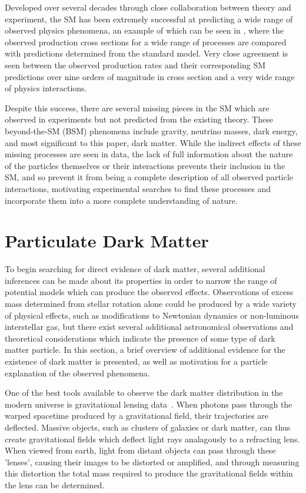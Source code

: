 Developed over several decades through close collaboration between theory and experiment, the SM has been extremely successful at predicting a wide range of observed physics phenomena, an example of which can be seen in , where the observed production cross sections for a wide range of processes are compared with predictions determined from the standard model.
Very close agreement is seen between the observed production rates and their corresponding SM predictions over nine orders of magnitude in cross section and a very wide range of physics interactions.

Despite this success, there are several missing pieces in the SM which are observed in experiments but not predicted from the existing theory.
These beyond-the-SM (BSM) phenomena include gravity, neutrino masses, dark energy, and most significant to this paper, dark matter.
While the indirect effects of these missing processes are seen in data, the lack of full information about the nature of the particles themselves or their interactions prevents their inclusion in the SM, and so prevent it from being a complete description of all observed particle interactions, motivating experimental searches to find these processes and incorporate them into a more complete understanding of nature.

\section{Particulate Dark Matter}
To begin searching for direct evidence of dark matter, several additional inferences can be made about its properties in order to narrow the range of potential models which can produce the observed effects.
Observations of excess mass determined from stellar rotation alone could be produced by a wide variety of physical effects, such as modifications to Newtonian dynamics or non-luminous interstellar gas, but there exist several additional astronomical observations and theoretical considerations which indicate the presence of some type of dark matter particle.
In this section, a brief overview of additional evidence for the existence of dark matter is presented, as well as motivation for a particle explanation of the observed phenomena.

One of the best tools available to observe the dark matter distribution in the modern universe is gravitational lensing data~\cite{Massey_2010}.
When photons pass through the warped spacetime produced by a gravitational field, their trajectories are deflected.
Massive objects, such as clusters of galaxies or dark matter, can thus create gravitational fields which deflect light rays analagously to a refracting lens.
When viewed from earth, light from distant objects can pass through these 'lenses', causing their images to be distorted or amplified, and through measuring this distortion the total mass required to produce the gravitational fields within the lens can be determined.

